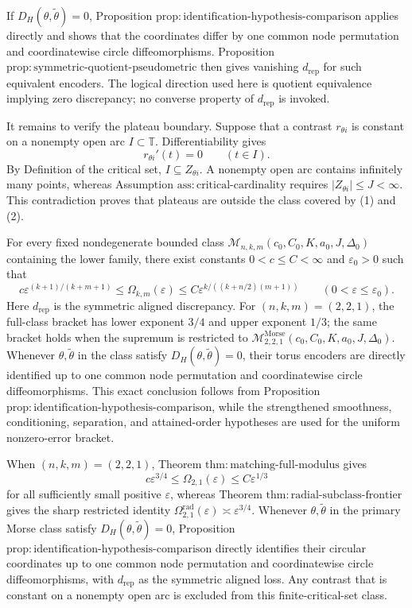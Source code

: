 If \(D_H(\theta,\widetilde\theta)=0\), Proposition \(\mathrm{prop:identification\text{-}hypothesis\text{-}comparison}\) applies directly and shows that the coordinates differ by one common node permutation and coordinatewise circle diffeomorphisms. Proposition \(\mathrm{prop:symmetric\text{-}quotient\text{-}pseudometric}\) then gives vanishing \(d_{\mathrm{rep}}\) for such equivalent encoders. The logical direction used here is quotient equivalence implying zero discrepancy; no converse property of \(d_{\mathrm{rep}}\) is invoked.

It remains to verify the plateau boundary. Suppose that a contrast \(r_{\theta i}\) is constant on a nonempty open arc \(I\subset\mathbb T\). Differentiability gives
\[
r_{\theta i}'(t)=0
\qquad (t\in I).
\]
By Definition of the critical set, \(I\subseteq Z_{\theta i}\). A nonempty open arc contains infinitely many points, whereas Assumption \(\mathrm{ass:critical\text{-}cardinality}\) requires \(|Z_{\theta i}|\leq J<\infty\). This contradiction proves that plateaus are outside the class covered by (1) and (2).

For every fixed nondegenerate bounded class \(\mathcal M_{n,k,m}(c_0,C_0,K,a_0,J,\Delta_0)\) containing the lower family, there exist constants \(0<c\leq C<\infty\) and \(\varepsilon_0>0\) such that
\[
c\varepsilon^{(k+1)/(k+m+1)}
\leq \Omega_{k,m}(\varepsilon)
\leq C\varepsilon^{k/((k+n/2)(m+1))}
\qquad (0<\varepsilon\leq\varepsilon_0).
\]
Here \(d_{\mathrm{rep}}\) is the symmetric aligned discrepancy. For \((n,k,m)=(2,2,1)\), the full-class bracket has lower exponent \(3/4\) and upper exponent \(1/3\); the same bracket holds when the supremum is restricted to \(\mathcal M^{\mathrm{Morse}}_{2,2,1}(c_0,C_0,K,a_0,J,\Delta_0)\). Whenever \(\theta,\widetilde\theta\) in the class satisfy \(D_H(\theta,\widetilde\theta)=0\), their torus encoders are directly identified up to one common node permutation and coordinatewise circle diffeomorphisms. This exact conclusion follows from Proposition \(\mathrm{prop:identification\text{-}hypothesis\text{-}comparison}\), while the strengthened smoothness, conditioning, separation, and attained-order hypotheses are used for the uniform nonzero-error bracket.

When \((n,k,m)=(2,2,1)\), Theorem \(\mathrm{thm:matching\text{-}full\text{-}modulus}\) gives
\[
c\varepsilon^{3/4}
\leq\Omega_{2,1}(\varepsilon)
\leq C\varepsilon^{1/3}
\]
for all sufficiently small positive \(\varepsilon\), whereas Theorem \(\mathrm{thm:radial\text{-}subclass\text{-}frontier}\) gives the sharp restricted identity \(\Omega_{2,1}^{\mathrm{rad}}(\varepsilon)\asymp\varepsilon^{3/4}\). Whenever \(\theta,\widetilde\theta\) in the primary Morse class satisfy \(D_H(\theta,\widetilde\theta)=0\), Proposition \(\mathrm{prop:identification\text{-}hypothesis\text{-}comparison}\) directly identifies their circular coordinates up to one common node permutation and coordinatewise circle diffeomorphisms, with \(d_{\mathrm{rep}}\) as the symmetric aligned loss. Any contrast that is constant on a nonempty open arc is excluded from this finite-critical-set class.

